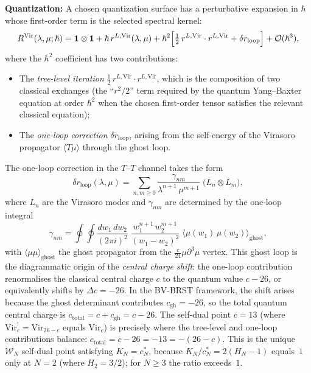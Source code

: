 \textbf{Quantization:} A chosen quantization surface has a
perturbative expansion in $\hbar$ whose first-order term is the
selected spectral kernel:
\begin{equation}
R^{\text{Vir}}(\lambda, \mu; \hbar)
= \mathbf{1} \otimes \mathbf{1}
 + \hbar\, r^{L,\text{Vir}}(\lambda,\mu)
 + \hbar^2 \Bigl[\tfrac{1}{2}\, r^{L,\text{Vir}} \cdot r^{L,\text{Vir}}
 + \delta r_{\text{loop}}\Bigr]
 + \mathcal{O}(\hbar^3),
\end{equation}
where the $\hbar^2$ coefficient has two contributions:
\begin{itemize}
\item The \emph{tree-level iteration}
$\tfrac{1}{2}\,r^{L,\text{Vir}} \cdot r^{L,\text{Vir}}$, which is
the composition of two classical exchanges (the ``$r^2/2$''
term required by the quantum Yang--Baxter equation at order
$\hbar^2$ when the chosen first-order tensor satisfies the relevant
classical equation);
\item The \emph{one-loop correction} $\delta r_{\text{loop}}$,
arising from the self-energy of the Virasoro propagator
$\langle T\mu \rangle$ through the ghost loop.
\end{itemize}

The one-loop correction in the $T$--$T$ channel takes the form
\begin{equation}
\delta r_{\text{loop}}(\lambda,\mu)
= \sum_{n,m \ge 0}
 \frac{\gamma_{nm}}{\lambda^{n+1}\,\mu^{m+1}}
 \;\bigl(L_n \otimes L_m\bigr),
\end{equation}
where $L_n$ are the Virasoro modes and $\gamma_{nm}$ are determined
by the one-loop integral
\[
\gamma_{nm}
= \oint \oint
 \frac{dw_1\, dw_2}{(2\pi i)^2}\;
 \frac{w_1^{n+1}\, w_2^{m+1}}{(w_1 - w_2)^2}
 \;\langle \mu(w_1)\, \mu(w_2) \rangle_{\text{ghost}},
\]
with $\langle \mu \mu \rangle_{\text{ghost}}$ the ghost propagator
from the $\tfrac{c}{24}\mu\partial^3\mu$ vertex. This ghost loop
is the diagrammatic origin of the \emph{central charge shift}:
the one-loop contribution renormalises the classical central charge
$c$ to the quantum value $c - 26$, or equivalently shifts by
$\Delta c = -26$. In the BV-BRST framework, the shift arises
because the ghost determinant contributes $c_{\text{gh}} = -26$,
so the total quantum central charge is $c_{\text{total}} = c + c_{\text{gh}} = c - 26$.
The self-dual point $c = 13$ (where
$\mathrm{Vir}_c^! = \mathrm{Vir}_{26-c}$ equals $\mathrm{Vir}_c$)
is precisely where the tree-level and one-loop contributions balance:
$c_{\text{total}} = c - 26 = -13 = -(26 - c)$. This is the unique
$\mathcal{W}_N$ self-dual point satisfying
$K_N = c^*_N$, because
$K_N/c^*_N = 2(H_N - 1)$ equals~$1$ only at $N = 2$ (where
$H_2 = 3/2$); for $N \ge 3$ the ratio exceeds~$1$.

